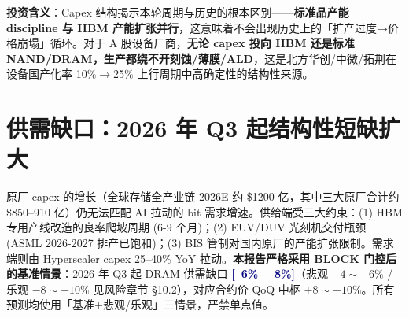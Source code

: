 \vspace{0.4em}
\noindent\textbf{投资含义}：Capex 结构揭示本轮周期与历史的根本区别——\textbf{标准品产能 discipline 与 HBM 产能扩张并行}，这意味着不会出现历史上的「扩产过度→价格崩塌」循环。对于 A 股设备厂商，\textbf{无论 capex 投向 HBM 还是标准 NAND/DRAM，生产都绕不开刻蚀/薄膜/ALD}，这是北方华创/中微/拓荆在设备国产化率 10\%\(\to\)25\% 上行周期中高确定性的结构性来源。

\section{供需缺口：2026 年 Q3 起结构性短缺扩大}

原厂 capex 的增长（全球存储全产业链 2026E 约 \$1200 亿，其中三大原厂合计约 \$850--910 亿）仍无法匹配 AI 拉动的 bit 需求增速。供给端受三大约束：(1) HBM 专用产线改造的良率爬坡周期 (6-9 个月)；(2) EUV/DUV 光刻机交付瓶颈 (ASML 2026-2027 排产已饱和)；(3) BIS 管制对国内原厂的产能扩张限制。需求端则由 Hyperscaler capex 25--40\% YoY 拉动。\textbf{本报告严格采用 BLOCK 门控后的基准情景}：2026 年 Q3 起 DRAM 供需缺口 \textcolor{navy}{\bfseries[--6\%\,~\,--8\%]}（悲观 \(-4\sim-6\%\) / 乐观 \(-8\sim-10\%\) 见风险章节 §10.2），对应合约价 QoQ 中枢 \(+8\sim+10\%\)。所有预测均使用「基准+悲观/乐观」三情景，严禁单点值。

